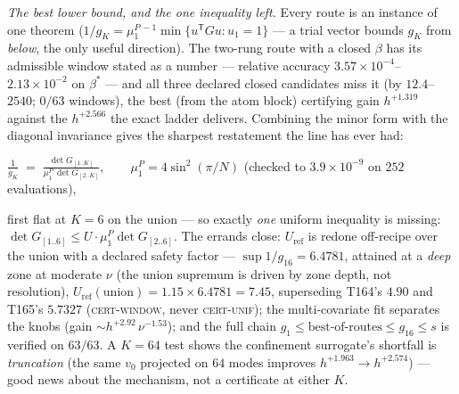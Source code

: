 \documentclass[11pt,a4paper]{article}
\begin{document}
\emph{The best lower bound, and the one inequality left.} Every route is an
instance of one theorem ($1/g_K=\mu^{P\,-1}_1\min\{u^{\mathsf T}Gu:u_1=1\}$
--- a trial vector bounds $g_K$ from \emph{below}, the only useful
direction). The two-rung route with a closed $\beta$ has its admissible
window stated as a number --- relative accuracy
$3.57\times10^{-4}$--$2.13\times10^{-2}$ on $\beta^*$ --- and all three
declared closed candidates miss it (by $12.4$--$2540$; $0/63$ windows), the
best (from the atom block) certifying gain $h^{+1.319}$ against the
$h^{+2.566}$ the exact ladder delivers. Combining the minor form with the
diagonal invariance gives the sharpest restatement the line has ever had:
\begin{keyeq}$\displaystyle
\frac1{g_K}\;=\;\frac{\det G_{[1..K]}}{\mu^P_1\,\det G_{[2..K]}},\qquad
\mu^P_1=4\sin^2(\pi/N)$
\quad(checked to $3.9\times10^{-9}$ on $252$ evaluations),
\end{keyeq}
\noindent first flat at $K=6$ on the union --- so exactly \emph{one} uniform
inequality is missing: $\det G_{[1..6]}\le U\cdot\mu^P_1\det G_{[2..6]}$. The
errands close: $U_{\mathrm{ref}}$ is redone off-recipe over the union with a
declared safety factor --- $\sup1/g_{16}=6.4781$, attained at a \emph{deep}
zone at moderate $\nu$ (the union supremum is driven by zone depth, not
resolution), $U_{\mathrm{ref}}(\text{union})=1.15\times6.4781=7.45$,
superseding T164's $4.90$ and T165's $5.7327$ (\textsc{cert-window}, never
\textsc{cert-unif}); the multi-covariate fit separates the knobs (gain
$\sim h^{+2.92}\,\nu^{-1.53}$); and the full chain $g_1\le\text{best-of-routes}
\le g_{16}\le s$ is verified on $63/63$. A $K=64$ test shows the confinement
surrogate's shortfall is \emph{truncation} (the same $v_0$ projected on $64$
modes improves $h^{+1.963}\to h^{+2.574}$) --- good news about the mechanism,
not a certificate at either $K$.
\end{document}
